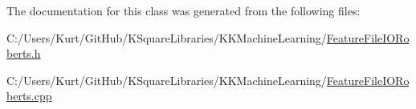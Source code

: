 The documentation for this class was generated from the following files\+:\begin{DoxyCompactItemize}
\item 
C\+:/\+Users/\+Kurt/\+Git\+Hub/\+K\+Square\+Libraries/\+K\+K\+Machine\+Learning/\hyperlink{_feature_file_i_o_roberts_8h}{Feature\+File\+I\+O\+Roberts.\+h}\item 
C\+:/\+Users/\+Kurt/\+Git\+Hub/\+K\+Square\+Libraries/\+K\+K\+Machine\+Learning/\hyperlink{_feature_file_i_o_roberts_8cpp}{Feature\+File\+I\+O\+Roberts.\+cpp}\end{DoxyCompactItemize}
